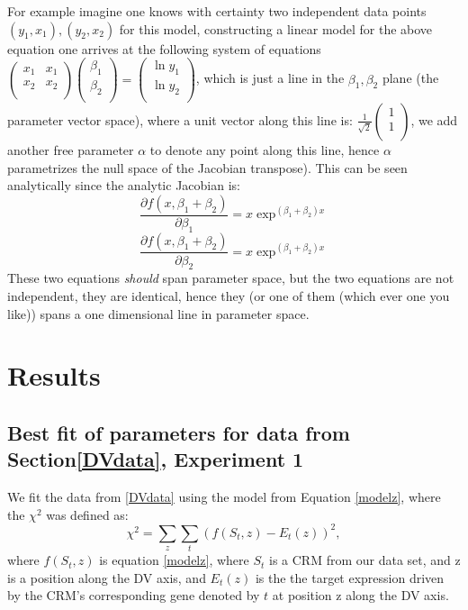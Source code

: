 For example imagine one knows with certainty two independent data points $(y_1, x_1), (y_2,x_2)$ for this model, constructing a linear model for the above equation one arrives at the following system of equations $\begin{pmatrix}  x_1&x_1\\ x_2 & x_2\\ \end{pmatrix} \begin{pmatrix} \beta_1\\ \beta_2 \\ \end{pmatrix} = \begin{pmatrix} \ln{y_1}\\ \ln{y_2} \\ \end{pmatrix} $, which is just a line in the $\beta_1,\beta_2$ plane (the parameter vector space), where a unit vector along this line is: $\frac{1}{\sqrt{2}}\begin{pmatrix} 1\\ 1\\ \end{pmatrix} $, we add another free parameter $\alpha$ to denote any point along this line, hence $\alpha$ parametrizes the null space of the Jacobian transpose).  This can be seen analytically since the analytic Jacobian is:
\begin{equation}
\frac{\partial{f(x,\beta_1+\beta_2)}}{\partial \beta_1} = x \exp^{(\beta_1 +\beta_2)x}
\end{equation}
\begin{equation}
\frac{\partial{f(x,\beta_1+\beta_2)}}{\partial \beta_2} = x \exp^{(\beta_1 +\beta_2)x}
\end{equation}
These two equations \emph{should} span parameter space, but the two equations are not independent, they are identical, hence they (or one of them (which ever one you like)) spans a one dimensional line in parameter space.
\section{Results}
\subsection{Best fit of parameters for data from Section\ref{DVdata}, Experiment 1}

We fit the data from \ref{DVdata} using the model from Equation \ref{modelz}, where the $\chi^2$ was defined as:
\begin{equation}\label{chi2}
\chi^2 = \sum_z \sum_t (f(S_t,z) - E_t(z) )^2,
\end{equation}
where $f(S_t,z)$ is equation \ref{modelz}, where $S_t$ is a CRM from our data set, and z is a position along the DV axis, and $E_t(z)$ is the the  target expression driven by the CRM's corresponding gene denoted by $t$ at position z along the DV axis. 


